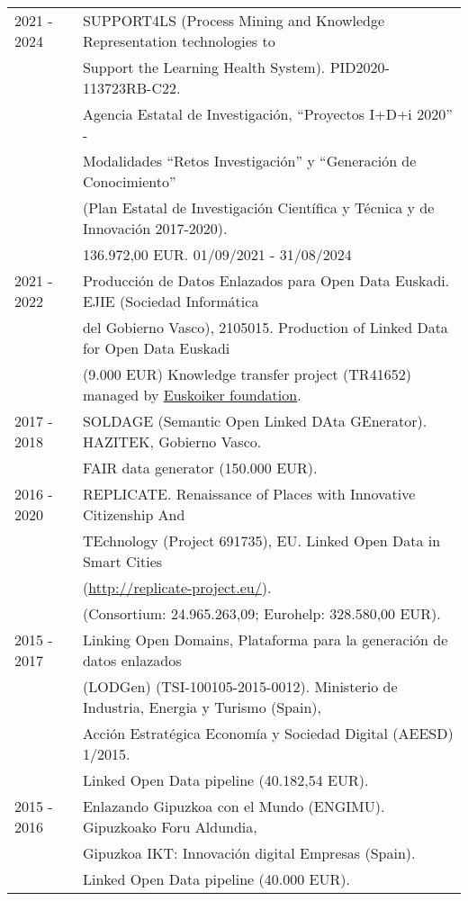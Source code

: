 \documentclass[11pt,fullpage]{article}
\begin{document}
\begin{tabular}{ll}
    2021 - 2024 & SUPPORT4LS (Process Mining and Knowledge Representation technologies to \\ 
                & Support the Learning Health System). PID2020-113723RB-C22. \\ 
                & Agencia Estatal de Investigación, ``Proyectos I+D+i 2020'' - \\ 
                & Modalidades ``Retos Investigación'' y ``Generación de Conocimiento'' \\ 
                & (Plan Estatal de Investigación Científica y Técnica y de Innovación 2017-2020). \\
                & 136.972,00 EUR. 01/09/2021 - 31/08/2024 \\
    2021 - 2022 &  Producci\'on de Datos Enlazados para Open Data Euskadi. EJIE (Sociedad Inform\'atica \\ 
                &  del Gobierno Vasco), 2105015. Production of Linked Data for Open Data Euskadi \\ 
                & (9.000 EUR) Knowledge transfer project (TR41652) managed by \href{http://www.euskoiker.ehu.es/faq-3}{Euskoiker foundation}. \\ 
    2017 - 2018 & SOLDAGE (Semantic Open Linked DAta GEnerator). HAZITEK, Gobierno Vasco. \\
                & FAIR data generator (150.000 EUR). \\
    2016 - 2020 & REPLICATE. Renaissance of Places with Innovative Citizenship And \\
                & TEchnology (Project 691735), EU. Linked Open Data in Smart Cities \\
                & (\href{http://replicate-project.eu/}{http://replicate-project.eu/}). \\
                & (Consortium: 24.965.263,09; Eurohelp: 328.580,00 EUR).  \\
    2015 - 2017 & Linking Open Domains, Plataforma para la generaci\'on de datos enlazados  \\
                & (LODGen) (TSI-100105-2015-0012). Ministerio de Industria, Energia y Turismo (Spain), \\
                & Acción Estratégica Economía y Sociedad Digital (AEESD) 1/2015.  \\
                & Linked Open Data pipeline (40.182,54 EUR). \\
    2015 - 2016 & Enlazando Gipuzkoa con el Mundo (ENGIMU). Gipuzkoako Foru Aldundia,  \\
         & Gipuzkoa IKT: Innovaci\'on digital Empresas (Spain).\\
         & Linked Open Data pipeline (40.000 EUR). \\
  \end{tabular}
\end{document}
